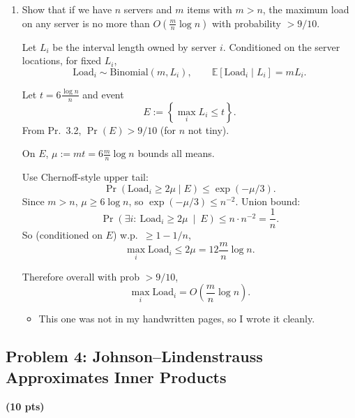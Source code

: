 \documentclass[10pt]{article}
\newcommand{\spara}[1]{\vspace{.5em}\noindent {\large\sffamily\textcolor{nyuOfficialPurple}{#1}}}
\newcommand{\E}{\mathbb{E}}
\begin{document}
\begin{enumerate}[label=\arabic*.]
\item Show that if we have $n$ servers and $m$ items with $m > n$, the maximum load on any server is no more than $O\!\left(\frac{m}{n}\log n\right)$ with probability $> 9/10$.

\spara{Pr. 3.3}

Let $L_i$ be the interval length owned by server $i$.
Conditioned on the server locations, for fixed $L_i$,
\[
\text{Load}_i \sim \mathrm{Binomial}(m,L_i),
\qquad
\E[\text{Load}_i\mid L_i]=mL_i.
\]

Let $t=6\frac{\log n}{n}$ and event
\[
E:=\left\{\max_i L_i\le t\right\}.
\]
From Pr.\ 3.2, $\Pr(E)>9/10$ (for $n$ not tiny).

On $E$, $\mu:=mt=6\frac{m}{n}\log n$ bounds all means.

Use Chernoff-style upper tail:
\[
\Pr(\text{Load}_i\ge 2\mu\mid E)\le \exp(-\mu/3).
\]
Since $m>n$, $\mu\ge 6\log n$, so $\exp(-\mu/3)\le n^{-2}$.
Union bound:
\[
\Pr\left(\exists i:\ \text{Load}_i\ge 2\mu\ \middle|\ E\right)\le n\cdot n^{-2}=\frac{1}{n}.
\]
So (conditioned on $E$) w.p.\ $\ge 1-1/n$,
\[
\max_i \text{Load}_i\le 2\mu = 12\frac{m}{n}\log n.
\]

Therefore overall with prob $>9/10$,
\[
\boxed{\max_i \text{Load}_i = O\!\left(\frac{m}{n}\log n\right).}
\]

\spara{Notes for Problem 3}
\begin{itemize}
\item This one was not in my handwritten pages, so I wrote it cleanly.
\end{itemize}

\end{enumerate}



\subsection{Problem 4: Johnson--Lindenstrauss Approximates Inner Products}
\textbf{(10 pts)}
\end{document}
